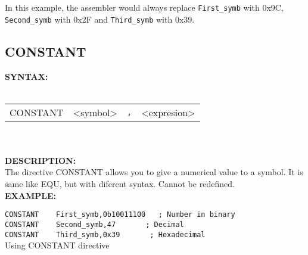             In this example, the assembler would always replace {\color{highlight_symbol}\verb'First_symb'} with 0x9C,
            {\color{highlight_symbol}\verb'Second_symb'} with 0x2F and {\color{highlight_symbol}\verb'Third_symb'} with 0x39.

                \subsection{CONSTANT}
                \textbf{SYNTAX:}\\
                    \\ {
                        \texttt{}
                        \begin{tabular}[h!]{llll}
                                { \color{highlight_directive} CONSTANT } &
                                { \color{highlight_symbol} <symbol> }  &
                                \verb',' &
                                { \color{highlight_constant} <expresion> }\\
                        \end{tabular}
                    }\\
                    \\
                \textbf{DESCRIPTION:}\\
                The directive CONSTANT allows you to give a numerical value to a symbol. It is same like EQU, but with diferent syntax. Cannot be redefined.\\

                \textbf{EXAMPLE:}\\
                    \begin{code}[h!]
                                {\color{highlight_directive}\verb'CONSTANT'}\verb'    '{\color{highlight_symbol}\verb'First_symb'}\verb','{\color{highlight_constant}\verb'0b10011100'}\verb'   '{\color{highlight_comment}\verb'; Number in binary'}\\
                                {\color{highlight_directive}\verb'CONSTANT'}\verb'    '{\color{highlight_symbol}\verb'Second_symb'}\verb','{\color{highlight_constant}\verb'47'}\verb'       '{\color{highlight_comment}\verb'; Decimal'}\\
                                {\color{highlight_directive}\verb'CONSTANT'}\verb'    '{\color{highlight_symbol}\verb'Third_symb'}\verb','{\color{highlight_constant}\verb'0x39'}\verb'       '{\color{highlight_comment}\verb'; Hexadecimal'}\\
                        \caption{Using CONSTANT directive}
                    \end{code}

